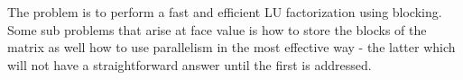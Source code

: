 The problem is to perform a fast and efficient LU factorization using blocking.
Some sub problems that arise at face value is how to store the blocks of the
matrix as well how to use parallelism   in the most effective way - the latter
which will not have a straightforward answer until the first is addressed. 



